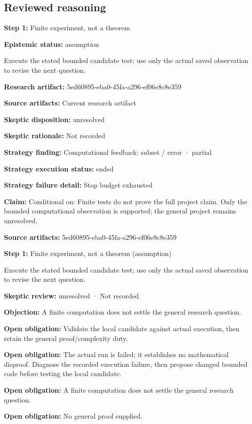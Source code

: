 \documentclass[11pt]{article}
\begin{document}
\subsection{Reviewed reasoning}
\textbf{Step 1:} Finite experiment, not a theorem\par
\textbf{Epistemic status:} assumption\par
Execute the stated bounded candidate test; use only the actual saved observation to revise the next question.\par
\textbf{Research artifact:} 5ed60895-eba0-45fa-a296-ef06e8c8e359\par
\textbf{Source artifacts:} Current research artifact\par
\textbf{Skeptic disposition:} unresolved\par
\textbf{Skeptic rationale:} Not recorded\par
\textbf{Strategy finding:} Computational feedback: subset / error · partial\par
\textbf{Strategy execution status:} ended\par
\textbf{Strategy failure detail:} Stop budget exhausted\par
\textbf{Claim:} Conditional on: Finite tests do not prove the full project claim. Only the bounded computational observation is supported; the general project remains unresolved.\par
\textbf{Source artifacts:} 5ed60895-eba0-45fa-a296-ef06e8c8e359\par
\textbf{Step 1:} Finite experiment, not a theorem (assumption)\par
Execute the stated bounded candidate test; use only the actual saved observation to revise the next question.\par
\textbf{Skeptic review:} unresolved · Not recorded\par
\textbf{Objection:} A finite computation does not settle the general research question.\par
\textbf{Open obligation:} Validate the local candidate against actual execution, then retain the general proof/complexity duty.\par
\textbf{Open obligation:} The actual run is failed; it establishes no mathematical disproof. Diagnose the recorded execution failure, then propose changed bounded code before testing the local candidate.\par
\textbf{Open obligation:} A finite computation does not settle the general research question.\par
\textbf{Open obligation:} No general proof supplied.\par
\end{document}
